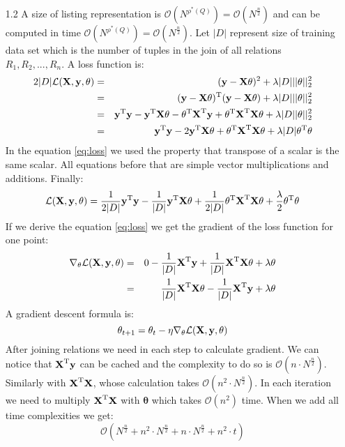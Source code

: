 \documentclass[10pt,a4paper]{article}
\begin{document}
\begin{enumerate}
\item[1.2]
A size of listing representation is $\mathcal{O}(N^{\rho^*(Q)})=\mathcal{O}(N^{\frac{n}{2}})$ and can be computed in time $\mathcal{O}(N^{\rho^*(Q)})=\mathcal{O}(N^{\frac{n}{2}})$. Let $|D|$ represent size of training data set which is the number of tuples in the join of all relations $R_1, R_2, ..., R_n$.  
A loss function is:
\begin{eqnarray}
2|D|\mathcal{L}(\textbf{\text{{X}}},\textbf{\text{{y}}}, \mathbf{\theta})  &=& (\textbf{\text{{y}}} - \textbf{\text{{X}}}\mathbf{\theta})^2 \nonumber + \lambda |D| ||\mathbf{\theta}||_2^2\\
			&=& (\textbf{\text{{y}}} - \textbf{\text{{X}}}\mathbf{\theta}) ^ \text{T}(\textbf{\text{{y}}} - \textbf{\text{{X}}}\mathbf{\theta}) + \lambda |D| ||\mathbf{\theta}||_2^2 \nonumber \\
&=&\textbf{\text{{y}}} ^ \text{T}\textbf{\text{{y}}} - \textbf{\text{{y}}} ^ \text{T}\textbf{\text{{X}}}\mathbf{\theta}
- \mathbf{\theta} ^ \text{T}\textbf{\text{{X}}} ^ \text{T} \textbf{\text{{y}}}
+ \mathbf{\theta} ^ \text{T}\textbf{\text{{X}}} ^ \text{T}\textbf{\text{{X}}}\mathbf{\theta} + \lambda |D| |\mathbf{\theta}||_2^2 \nonumber \\
&=&
\textbf{\text{{y}}} ^ \text{T}\textbf{\text{{y}}} - 2 \textbf{\text{{y}}} ^ \text{T}\textbf{\text{{X}}}\mathbf{\theta}
+ \mathbf{\theta} ^ \text{T}\textbf{\text{{X}}} ^ \text{T}\textbf{\text{{X}}}\mathbf{\theta} + \lambda |D| \mathbf{\theta} ^ \text{T}\mathbf{\theta}
\label{eq:loss}
\end{eqnarray}
In the equation \ref{eq:loss} we used the property that transpose of a scalar is the same scalar. All equations before that are simple vector multiplications and additions. 
Finally: 
$$\mathcal{L}(\textbf{\text{{X}}},\textbf{\text{{y}}}, \mathbf{\theta}) = 
\frac{1}{2|D|} \textbf{\text{{y}}} ^ \text{T}\textbf{\text{{y}}} - \frac{1}{|D|} \textbf{\text{{y}}} ^ \text{T}\textbf{\text{{X}}}\mathbf{\theta}
+ \frac{1}{2|D|}\mathbf{\theta} ^ \text{T}\textbf{\text{{X}}} ^ \text{T}\textbf{\text{{X}}}\mathbf{\theta} + 
\frac{\lambda}{2} \mathbf{\theta} ^ \text{T}\mathbf{\theta}
$$
If we derive the equation \ref{eq:loss} we get the gradient of the loss function for one point:
\begin{eqnarray}
\nabla_{\mathbf{\theta}} \mathcal{L}(\textbf{\text{{X}}},\textbf{\text{{y}}}, \mathbf{\theta}) &=& 0  - \frac{1}{|D|}\textbf{\text{{X}}} ^ \text{T}\textbf{\text{{y}}} + \frac{1}{|D|}\textbf{\text{{X}}} ^ \text{T}\textbf{\text{{X}}}\mathbf{\theta} + \lambda \mathbf{\theta} \nonumber \\
&=& \frac{1}{|D|}\textbf{\text{{X}}} ^ \text{T}\textbf{\text{{X}}}\mathbf{\theta} - \frac{1}{|D|}\textbf{\text{{X}}} ^ \text{T}\textbf{\text{{y}}} + \lambda \mathbf{\theta}\nonumber
\end{eqnarray}
A gradient descent formula is:
$$\mathbf{\theta}_{t+1}=\mathbf{\theta}_t - \eta\nabla_{\mathbf{\theta}} \mathcal{L}(\textbf{\text{{X}}},\textbf{\text{{y}}}, \mathbf{\theta})$$
After joining relations we need in each step to calculate gradient. 
We can notice that $\textbf{\text{{X}}} ^ \text{T}\textbf{\text{{y}}}$ can be cached and the complexity to do so is $\mathcal{O}(n \cdot N^\frac{n}{2})$. Similarly with $\textbf{\text{{X}}} ^ \text{T}\textbf{\text{{X}}}$, whose calculation takes $\mathcal{O}(n^2 \cdot N^\frac{n}{2})$. In each iteration we need to multiply $\textbf{\text{{X}}} ^ \text{T}\textbf{\text{{X}}}$ with $\mathbf{\theta}$ which takes $\mathcal{O}(n^2)$ time.  
When we add  all time complexities we get:
$$\mathcal{O}(N^\frac{n}{2} + n^2 \cdot N^\frac{n}{2} + n \cdot  N^\frac{n}{2} + n^2 \cdot t) $$


\end{enumerate}
\end{document}
